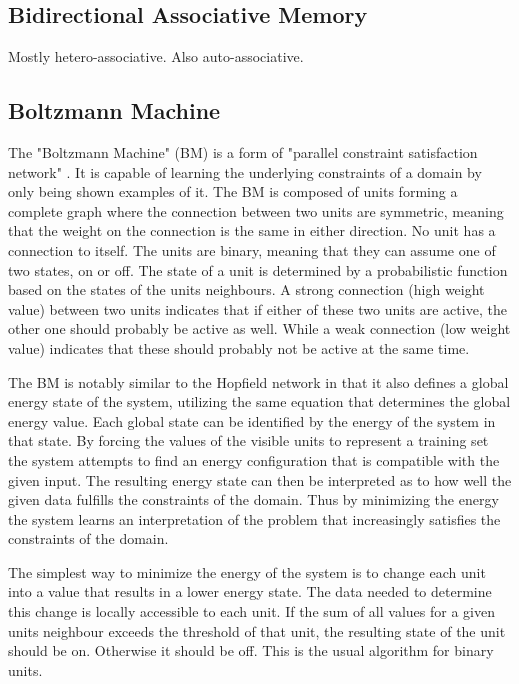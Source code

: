 \documentclass[12pt, a4paper]{article}
\begin{document}

\subsection{Bidirectional Associative Memory}

Mostly hetero-associative. Also auto-associative.

\subsection{Boltzmann Machine}


The "Boltzmann Machine" (BM) is a form of "parallel constraint satisfaction network" \cite{ackley1985learning}. It is capable of learning the underlying constraints of a domain by only being shown examples of it. The BM is composed of units forming a complete graph where the connection between two units are symmetric, meaning that the weight on the connection is the same in either direction. No unit has a connection to itself. The units are binary, meaning that they can assume one of two states, on or off. The state of a unit is determined by a probabilistic function based on the states of the units neighbours. A strong connection (high weight value) between two units indicates that if either of these two units are active, the other one should probably be active as well. While a weak connection (low weight value) indicates that these should probably not be active at the same time.

The BM is notably similar to the Hopfield network in that it also defines a global energy state of the system, utilizing the same equation that determines the global energy value. Each global state can be identified by the energy of the system in that state. By forcing the values of the visible units to represent a training set the system attempts to find an energy configuration that is compatible with the given input. The resulting energy state can then be interpreted as to how well the given data fulfills the constraints of the domain. Thus by minimizing the energy the system learns an interpretation of the problem that increasingly satisfies the constraints of the domain.

The simplest way to minimize the energy of the system is to change each unit into a value that results in a lower energy state. The data needed to determine this change is locally accessible to each unit. If the sum of all values for a given units neighbour exceeds the threshold of that unit, the resulting state of the unit should be on. Otherwise it should be off. This is the usual algorithm for binary units.
\end{document}
